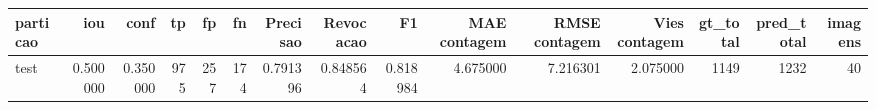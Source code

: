\begin{tabular}{lrrrrrrrrrrrrrr}
\toprule
particao & iou & conf & tp & fp & fn & Precisao & Revocacao & F1 & MAE contagem & RMSE contagem & Vies contagem & gt_total & pred_total & imagens \\
\midrule
test & 0.500000 & 0.350000 & 975 & 257 & 174 & 0.791396 & 0.848564 & 0.818984 & 4.675000 & 7.216301 & 2.075000 & 1149 & 1232 & 40 \\
\bottomrule
\end{tabular}
